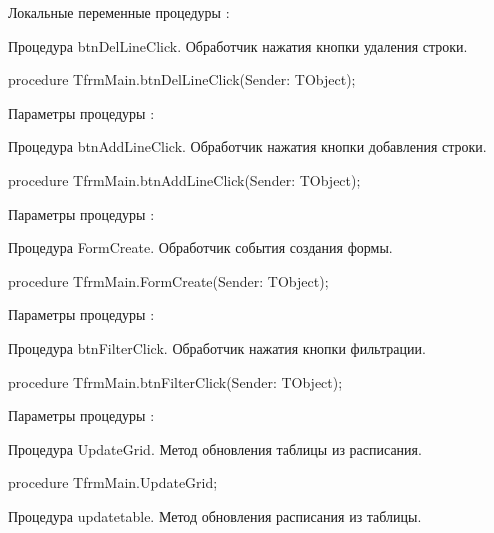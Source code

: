{Локальные переменные  процедуры :






\item Процедура btnDelLineClick. Обработчик нажатия кнопки удаления строки.
   
 procedure TfrmMain.btnDelLineClick(Sender: TObject);

Параметры процедуры :

\item Процедура btnAddLineClick. Обработчик нажатия кнопки добавления строки.

 procedure  TfrmMain.btnAddLineClick(Sender: TObject);

Параметры процедуры :

\item Процедура FormCreate. Обработчик события создания формы.

 procedure  TfrmMain.FormCreate(Sender: TObject);

Параметры процедуры :

  \item Процедура btnFilterClick.  Обработчик нажатия кнопки фильтрации.
   
 procedure  TfrmMain.btnFilterClick(Sender: TObject);

Параметры процедуры :
   
\item Процедура UpdateGrid. Метод обновления таблицы из расписания.
    
procedure  TfrmMain.UpdateGrid;
    
\item Процедура updatetable. Метод обновления расписания из таблицы.
    
}
